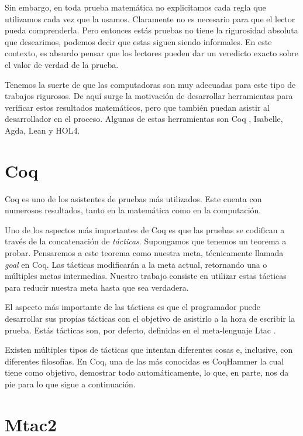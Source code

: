 Sin embargo, en toda prueba matemática no explicitamos cada regla que utilizamos cada vez que la usamos.
Claramente no es necesario para que el lector pueda comprenderla.
Pero entonces estás pruebas no tiene la rigurosidad absoluta que desearimos, podemos decir que estas siguen siendo informales.
En este contexto, es absurdo pensar que los lectores pueden dar un veredicto exacto sobre el valor de verdad de la prueba.

Tenemos la suerte de que las computadoras son muy adecuadas para este tipo de trabajos rigurosos. De aquí surge la motivación de desarrollar herramientas para verificar estos resultados matemáticos, pero que también puedan asistir al desarrollador en el proceso. Algunas de estas herramientas son Coq \cite{CIC}, Isabelle, Agda, Lean y HOL4.

\section{Coq}

Coq es uno de los asistentes de pruebas más utilizados.
Este cuenta con numerosos resultados, tanto en la matemática como en la computación.

Uno de los aspectos más importantes de Coq es que las pruebas se codifican a través de la concatenación de \emph{tácticas}.
Supongamos que tenemos un teorema a probar.
Pensaremos a este teorema como nuestra meta, técnicamente llamada \emph{goal} en Coq.
Las tácticas modificarán a la meta actual, retornando una o múltiples metas intermedias.
Nuestro trabajo consiste en utilizar estas tácticas para reducir nuestra meta hasta que sea verdadera.

El aspecto más importante de las tácticas es que el programador puede desarrollar sus propias tácticas con el objetivo de asistirlo a la hora de escribir la prueba.
Estás tácticas son, por defecto, definidas en el meta-lenguaje Ltac \cite{DBLP:conf/lpar/Delahaye00}.

Existen múltiples tipos de tácticas que intentan diferentes cosas e, inclusive, con diferentes filosofías.
En Coq, una de las más conocidas es CoqHammer \cite{DBLP:journals/jar/CzajkaK18} la cual tiene como objetivo, demostrar todo automáticamente, lo que, en parte, nos da pie para lo que sigue a continuación.

\section{Mtac2}

